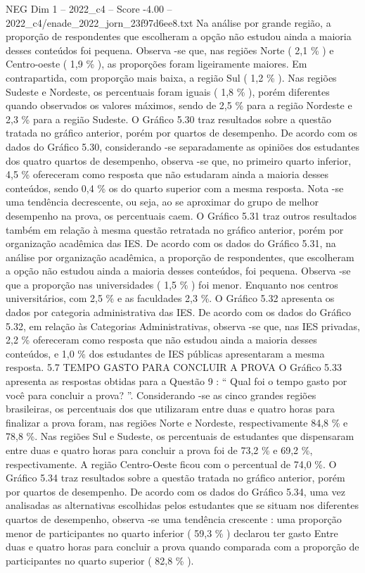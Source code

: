 \begin{textsample}{NEG Dim 1 – 2022\_c4 – Score -4.00 – 2022\_c4/enade\_2022\_jorn\_23f97d6ee8.txt}
Na análise por grande região, a proporção de respondentes que escolheram a opção não estudou ainda a maioria desses conteúdos foi pequena.
Observa -se que, nas regiões Norte ( 2,1 \% ) e Centro-oeste ( 1,9 \% ), as proporções foram ligeiramente maiores.
Em contrapartida, com proporção mais baixa, a região Sul ( 1,2 \% ).
Nas regiões Sudeste e Nordeste, os percentuais foram iguais ( 1,8 \% ), porém diferentes quando observados os valores máximos, sendo de 2,5 \% para a região Nordeste e 2,3 \% para a região Sudeste.
O Gráfico 5.30 traz resultados sobre a questão tratada no gráfico anterior, porém por quartos de desempenho.
De acordo com os dados do Gráfico 5.30, considerando -se separadamente as opiniões dos estudantes dos quatro quartos de desempenho, observa -se que, no primeiro quarto inferior, 4,5 \% ofereceram como resposta que não estudaram ainda a maioria desses conteúdos, sendo 0,4 \% os do quarto superior com a mesma resposta.
Nota -se uma tendência decrescente, ou seja, ao se aproximar do grupo de melhor desempenho na prova, os percentuais caem.
O Gráfico 5.31 traz outros resultados também em relação à mesma questão retratada no gráfico anterior, porém por organização acadêmica das IES.
De acordo com os dados do Gráfico 5.31, na análise por organização acadêmica, a proporção de respondentes, que escolheram a opção não estudou ainda a maioria desses conteúdos, foi pequena.
Observa -se que a proporção nas universidades ( 1,5 \% ) foi menor.
Enquanto nos centros universitários, com 2,5 \% e as faculdades 2,3 \%.
O Gráfico 5.32 apresenta os dados por categoria administrativa das IES.
De acordo com os dados do Gráfico 5.32, em relação às Categorias Administrativas, observa -se que, nas IES privadas, 2,2 \% ofereceram como resposta que não estudou ainda a maioria desses conteúdos, e 1,0 \% dos estudantes de IES públicas apresentaram a mesma resposta. 5.7 TEMPO GASTO PARA CONCLUIR A PROVA O Gráfico 5.33 apresenta as respostas obtidas para a Questão 9 : “ Qual foi o tempo gasto por você para concluir a prova? ”.
Considerando -se as cinco grandes regiões brasileiras, os percentuais dos que utilizaram entre duas e quatro horas para finalizar a prova foram, nas regiões Norte e Nordeste, respectivamente 84,8 \% e 78,8 \%.
Nas regiões Sul e Sudeste, os percentuais de estudantes que dispensaram entre duas e quatro horas para concluir a prova foi de 73,2 \% e 69,2 \%, respectivamente.
A região Centro-Oeste ficou com o percentual de 74,0 \%.
O Gráfico 5.34 traz resultados sobre a questão tratada no gráfico anterior, porém por quartos de desempenho.
De acordo com os dados do Gráfico 5.34, uma vez analisadas as alternativas escolhidas pelos estudantes que se situam nos diferentes quartos de desempenho, observa -se uma tendência crescente : uma proporção menor de participantes no quarto inferior ( 59,3 \% ) declarou ter gasto Entre duas e quatro horas para concluir a prova quando comparada com a proporção de participantes no quarto superior ( 82,8 \% ).

\end{textsample}
